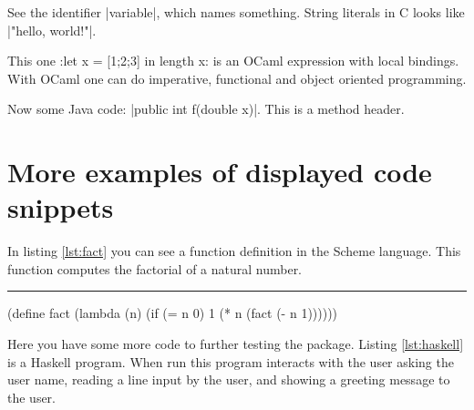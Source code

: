 \documentclass[10pt,a4paper]{article}
\begin{document}
\begin{Example}
  See the identifier \pyginline[inline method=efbox,colback=green!25]|variable|,
  which names something. String literals in C looks like
  \pyginline[lang=c,inline method=tcbox,colback=blue!20,boxrule=2pt]|"hello, world!\n"|.
\end{Example}


\begin{Example}
  This one
  \pyginline[lang=ocaml,font=\ttfamily\scriptsize,topline=false]:let x = [1;2;3] in length x:
  is an OCaml expression with local bindings. With OCaml one can do
  imperative, functional and object oriented programming.
\end{Example}

\begin{Example}
  Now some Java code:
  \pyginline[lang=java,sty=colorful,font=\ttfamily\itshape,linewidth=1pt]|public int f(double x)|.
  This is a method header.
\end{Example}

\section{More examples of displayed code snippets}


In listing \ref{lst:fact} you can see a function definition in the
Scheme language. This function computes the factorial of a natural
number.
\newline\rule{\linewidth}{2pt}
\begin{pygmented}[
  sty=emacs,
  linenos,
  label=lst:fact,
  caption=A Scheme function.
  ]
(define fact
    (lambda (n)
        (if (= n 0)
            1
            (* n (fact (- n 1))))))
\end{pygmented}

Here you have some more code to further testing the package. Listing
\ref{lst:haskell} is a Haskell program. When run this program interacts
with the user asking the user name, reading a line input by the user,
and showing a greeting message to the user.

\end{document}
